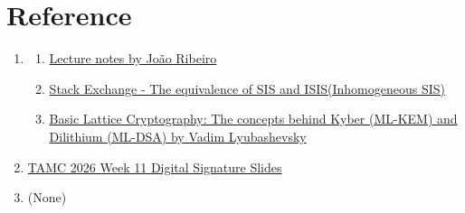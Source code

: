 


\clearpage
{}


\clearpage
{}







\clearpage
\section*{Reference}
\begin{enumerate}
    \item[P1] 
    \begin{enumerate}
        \item[(i)] \href{https://jmlribeiro.github.io/crypto_mini_course_notes2.pdf}{Lecture notes by João Ribeiro}
        \item [(ii)] \href{https://crypto.stackexchange.com/a/87109}{Stack Exchange - The equivalence of SIS and ISIS(Inhomogeneous SIS)}
        \item [(iii)] \href{https://eprint.iacr.org/2024/1287.pdf}{Basic Lattice Cryptography: The concepts behind Kyber (ML-KEM) and Dilithium (ML-DSA) by Vadim Lyubashevsky}
    \end{enumerate}
\item[P2] \href{https://docs.google.com/presentation/d/1Om0mjrkP7xiz3dSjR1Lc6-hMyIbLWzjl/edit?usp=drive_link&ouid=114163345387795986070&rtpof=true&sd=true}{TAMC 2026 Week 11 Digital Signature Slides}
    \item[P3] (None)
\end{enumerate}